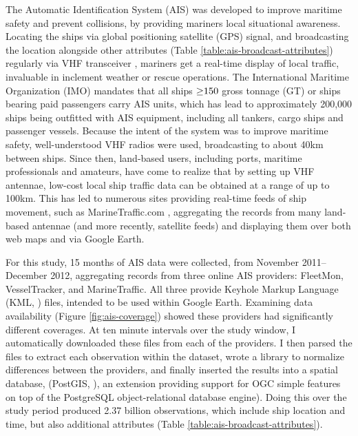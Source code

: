 The Automatic Identification System (AIS) \citep{no20041028,Tetreault2002} was developed to improve maritime safety and prevent collisions, by providing mariners local situational awareness. Locating the ships via global positioning satellite (GPS) signal, and broadcasting the location alongside other attributes (Table \ref{table:ais-broadcast-attributes}) regularly via VHF transceiver \citep{Itu-r2010}, mariners get a real-time display of local traffic, invaluable in inclement weather or rescue operations.  The International Maritime Organization (IMO) mandates that all ships $\geq\negthickspace 150$ gross tonnage (GT) or ships bearing paid passengers carry AIS units, which has lead to approximately 200,000 ships being outfitted with AIS equipment, including all tankers, cargo ships and passenger vessels. Because the intent of the system was to improve maritime safety, well-understood VHF radios were used, broadcasting to about 40km between ships. Since then, land-based users, including ports, maritime professionals and amateurs, have come to realize that by setting up VHF antennae, low-cost local ship traffic data can be obtained at a range of up to 100km. This has led to numerous sites providing real-time feeds of ship movement, such as MarineTraffic.com \citep{MarineTraffic}, aggregating the records from many land-based antennae (and more recently, satellite feeds) and displaying them over both web maps and via Google Earth. 

For this study, 15 months of AIS data were collected, from November 2011--December 2012, aggregating records from three online AIS providers: FleetMon, VesselTracker, and MarineTraffic. All three provide Keyhole Markup Language (KML, \citeauthor{KML}) files, intended to be used within Google Earth. Examining data availability (Figure \ref{fig:ais-coverage}) showed these providers had significantly different coverages. At ten minute intervals over the study window, I automatically downloaded these files from each of the providers. I then parsed the files to extract each observation within the dataset, wrote a library to normalize differences between the providers, and finally inserted the results into a spatial database, (PostGIS, \citeauthor{ramsey2005postgis}), an extension providing support for OGC simple features \cite{OGCSimple} on top of the PostgreSQL \citep{postgresql} object-relational database engine). Doing this over the study period produced 2.37 billion observations, which include ship location and time, but also additional attributes (Table \ref{table:ais-broadcast-attributes}).

